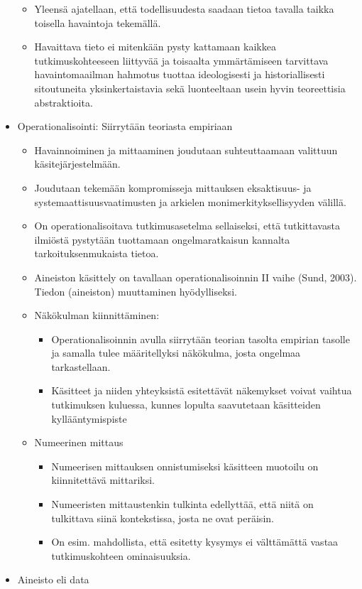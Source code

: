 \documentclass[
]{book}
\providecommand{\tightlist}{%
  \setlength{\itemsep}{0pt}\setlength{\parskip}{0pt}}
\begin{document}
\begin{itemize}
  \begin{itemize}
  \tightlist
  \item
    Yleensä ajatellaan, että todellisuudesta saadaan tietoa tavalla taikka toisella havaintoja tekemällä.
  \item
    Havaittava tieto ei mitenkään pysty kattamaan kaikkea tutkimuskohteeseen liittyvää ja toisaalta ymmärtämiseen tarvittava havaintomaailman hahmotus tuottaa ideologisesti ja historiallisesti sitoutuneita yksinkertaistavia sekä luonteeltaan usein hyvin teoreettisia abstraktioita.
  \end{itemize}
\item
  Operationalisointi: Siirrytään teoriasta empiriaan

  \begin{itemize}
  \tightlist
  \item
    Havainnoiminen ja mittaaminen joudutaan suhteuttaamaan valittuun käsitejärjestelmään.
  \item
    Joudutaan tekemään kompromisseja mittauksen eksaktisuus- ja systemaattisuusvaatimusten ja arkielen monimerkityksellisyyden välillä.
  \item
    On operationalisoitava tutkimusasetelma sellaiseksi, että tutkittavasta ilmiöstä pystytään tuottamaan ongelmaratkaisun kannalta tarkoituksenmukaista tietoa.
  \item
    Aineiston käsittely on tavallaan operationalisoinnin II vaihe (Sund, 2003). Tiedon (aineiston) muuttaminen hyödylliseksi.
  \item
    Näkökulman kiinnittäminen:

    \begin{itemize}
    \tightlist
    \item
      Operationalisoinnin avulla siirrytään teorian tasolta empirian tasolle ja samalla tulee määritellyksi näkökulma, josta ongelmaa tarkastellaan.
    \item
      Käsitteet ja niiden yhteyksistä esitettävät näkemykset voivat vaihtua tutkimuksen kuluessa, kunnes lopulta saavutetaan käsitteiden kyllääntymispiste
    \end{itemize}
  \item
    Numeerinen mittaus

    \begin{itemize}
    \tightlist
    \item
      Numeerisen mittauksen onnistumiseksi käsitteen muotoilu on kiinnitettävä mittariksi.
    \item
      Numeeristen mittaustenkin tulkinta edellyttää, että niitä on tulkittava siinä kontekstissa, josta ne ovat peräisin.
    \item
      On esim. mahdollista, että esitetty kysymys ei välttämättä vastaa tutkimuskohteen ominaisuuksia.
    \end{itemize}
  \end{itemize}
\item
  Aineisto eli data


\end{itemize}
\end{document}
